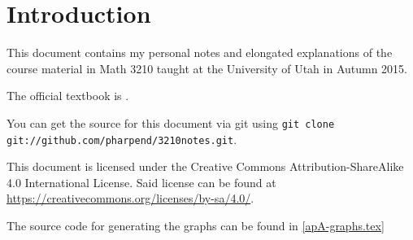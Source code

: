 \chapter{Introduction}

This document contains my personal notes and elongated explanations of the
course material in Math 3210 taught at the University of Utah in Autumn 2015.

The official textbook is \textbf{}.

You can get the source for this document via git using \texttt{git clone
  git://github.com/pharpend/3210notes.git}.

This document is licensed under the Creative Commons Attribution-ShareAlike 4.0
International License. Said license can be found at
\url{https://creativecommons.org/licenses/by-sa/4.0/}.

The source code for generating the graphs can be found in \cref{apA-graphs.tex}